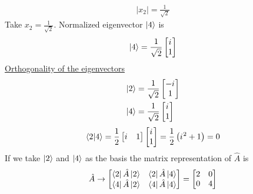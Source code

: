 \begin{enumerate}
\begin{eqnarray}
	\left|x_2\right| = \frac{1}{\sqrt{2}}
	\end{eqnarray}
	Take $x_2 = \frac{1}{\sqrt{2}}$.	
	Normalized eigenvector $\ket{4}$ is
	\begin{equation}
	\ket{4} = \frac{1}{\sqrt{2}} \left[\begin{matrix}
	{i\mkern1mu} \\ 1
	\end{matrix}\right]
	\end{equation}
	\underline{Orthogonality of the eigenvectors}
	\begin{eqnarray}
	\ket{2} &= \frac{1}{\sqrt{2}} \left[\begin{matrix}
	-{i\mkern1mu} \\ 1
	\end{matrix}\right] \\
	\ket{4} &= \frac{1}{\sqrt{2}} \left[\begin{matrix}
	{i\mkern1mu} \\ 1
	\end{matrix}\right]
	\end{eqnarray}
	\begin{equation}
		\braket{2}{4} = \frac{1}{2} \left[\begin{matrix}
		{i\mkern1mu} & 1
		\end{matrix}\right] \left[\begin{matrix}
		{i\mkern1mu} \\ 1
		\end{matrix}\right] = \frac{1}{2} \left({i\mkern1mu}^2 + 1\right) = 0
	\end{equation}
	If we take $\ket{2}$ and $\ket{4}$ as the basis the matrix representation of $\hat{A}$ is
	\begin{equation}
		\hat{A} \rightarrow 
		\left[\begin{matrix}
			\bra{2}\hat{A}\ket{2} & \bra{2}\hat{A}\ket{4} \\
			\bra{4}\hat{A}\ket{2} & \bra{4}\hat{A}\ket{4}
		\end{matrix}\right] 
		= \left[\begin{matrix}
			2 & 0 \\ 0 & 4
		\end{matrix}\right]
	\end{equation}
	

\end{enumerate}
